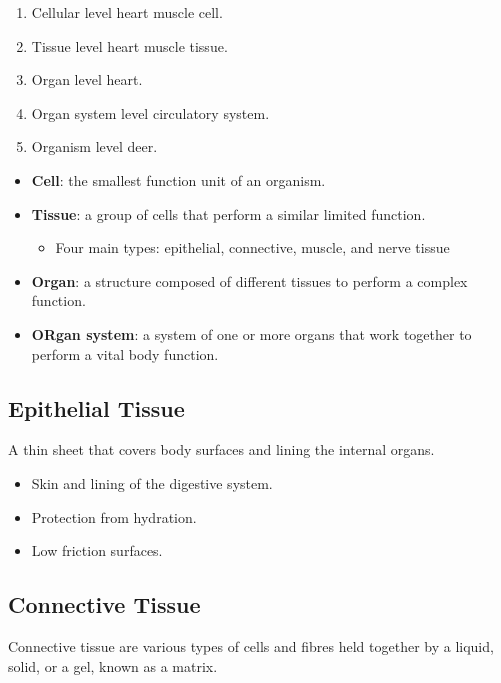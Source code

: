\documentclass[12pt]{report}
\begin{document}
\begin{enumerate}
\setlength\itemsep{0.5em}
    \item{Cellular level heart muscle cell.}
    \item{Tissue level heart muscle tissue.}
    \item{Organ level heart.}
    \item{Organ system level circulatory system.}
    \item{Organism level deer.}
\end{enumerate}
\invis
\begin{itemize}
    \item{ \textbf{Cell}: the smallest function unit of an organism.}
    \item{ \textbf{Tissue}: a group of cells that perform a similar limited function.}
        \begin{itemize}
            \item{Four main types: epithelial, connective, muscle, and nerve tissue}
        \end{itemize}
    \item{ \textbf{Organ}: a structure composed of different tissues to perform a complex function.}
    \item{ \textbf{ORgan system}: a system of one or more organs that work together to perform a vital body function.}
\end{itemize}

\subsection{Epithelial Tissue}
\begin{definition}
    A thin sheet that covers body surfaces and lining the internal organs.
\end{definition}

\begin{itemize}
    \item{Skin and lining of the digestive system.}
    \item{Protection from hydration.}
    \item{Low friction surfaces.}
\end{itemize}

\subsection{Connective Tissue}
\begin{definition}
    Connective tissue are various types of cells and fibres held together by a liquid, solid, or a gel, known as a matrix.
\end{definition}
\end{document}
